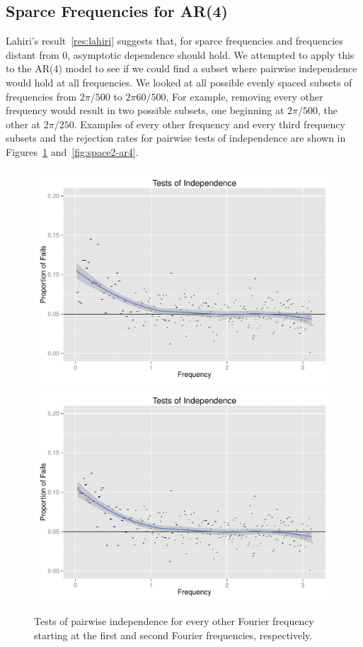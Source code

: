 \documentclass{article}\usepackage{graphicx, color}
\newenvironment{knitrout}{}{} %
\theoremstyle{plain}
\begin{document}
\subsection{Sparce Frequencies for AR(4)} \label{sec:sparce}
Lahiri's result~\ref{res:lahiri} suggests that, for sparce frequencies and frequencies distant from 0, asymptotic dependence should hold. We attempted to apply this to the AR(4) model to see if we could find a subset where pairwise independence would hold at all frequencies. We looked at all possible evenly spaced subsets of frequencies from $2\pi/500$ to $2\pi 60/500$, For example, removing every other frequency would result in two possible subsets, one beginning at $2\pi/500$, the other at $2\pi/250$. Examples of every other frequency and every third frequency subsets and the rejection rates for pairwise tests of independence are shown in Figures~\ref{fig:space1-ar4} and~\ref{fig:space2-ar4}.

\begin{knitrout}
\color{fgcolor}\begin{figure}[H]

\includegraphics[width=.49\textwidth]{figure/space1-ar41} 
\includegraphics[width=.49\textwidth]{figure/space1-ar42} \caption[Tests of pairwise independence for every other Fourier frequency starting at the first and second Fourier frequencies, respectively]{Tests of pairwise independence for every other Fourier frequency starting at the first and second Fourier frequencies, respectively.\label{fig:space1-ar4}}
\end{figure}


\end{knitrout}
\end{document}
